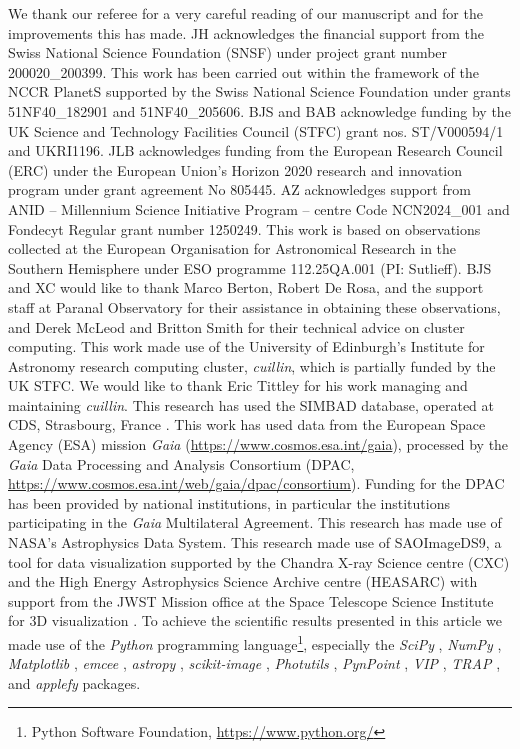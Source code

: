 \documentclass{aa}
\begin{document}
\begin{acknowledgements}

We thank our referee for a very careful reading of our manuscript and for the improvements this has made.
%
JH acknowledges the financial support from the Swiss National Science Foundation (SNSF) under project grant number 200020\_200399.
%
This work has been carried out within the framework of the NCCR PlanetS supported by the Swiss National Science Foundation under grants 51NF40\_182901 and 51NF40\_205606.
%
BJS and BAB acknowledge funding by the UK Science and Technology Facilities Council (STFC) grant nos. ST/V000594/1 and UKRI1196.
%
JLB acknowledges funding from the European Research Council (ERC) under the European Union's Horizon 2020 research and innovation program under grant agreement No 805445.
%
AZ acknowledges support from ANID -- Millennium Science Initiative Program -- centre Code NCN2024\_001 and Fondecyt Regular grant number 1250249.
%
This work is based on observations collected at the European Organisation for Astronomical Research in the Southern Hemisphere under ESO programme 112.25QA.001 (PI: Sutlieff).
%
BJS and XC would like to thank Marco Berton, Robert De Rosa, and the support staff at Paranal Observatory for their assistance in obtaining these observations, and Derek McLeod and Britton Smith for their technical advice on cluster computing.
%
This work made use of the University of Edinburgh's Institute for Astronomy research computing cluster, {\sl cuillin}, which is partially funded by the UK STFC. We would like to thank Eric Tittley for his work managing and maintaining {\sl cuillin}.
%
This research has used the SIMBAD database, operated at CDS, Strasbourg, France \citep{wenger2000}.
%
This work has used data from the European Space Agency (ESA) mission {\it Gaia} (\url{https://www.cosmos.esa.int/gaia}), processed by the {\it Gaia} Data Processing and Analysis Consortium (DPAC, \url{https://www.cosmos.esa.int/web/gaia/dpac/consortium}).
%
Funding for the DPAC has been provided by national institutions, in particular the institutions participating in the {\it Gaia} Multilateral Agreement.
%
This research has made use of NASA's Astrophysics Data System.
%
This research made use of SAOImageDS9, a tool for data visualization supported by the Chandra X-ray Science centre (CXC) and the High Energy Astrophysics Science Archive centre (HEASARC) with support from the JWST Mission office at the Space Telescope Science Institute for 3D visualization \citep{2003ASPC..295..489J}.
%
To achieve the scientific results presented in this article we made use of the \emph{Python} programming language\footnote{Python Software Foundation, \url{https://www.python.org/}}, especially the \emph{SciPy} \citep{virtanen2020}, \emph{NumPy} \citep{numpy}, \emph{Matplotlib} \citep{Matplotlib}, \emph{emcee} \citep{foreman-mackey2013}, \emph{astropy} \citep{astropy_1,astropy_2,astropy_3}, \emph{scikit-image} \citep{scikit-image}, \emph{Photutils} \citep{larry_bradley_2022_6385735}, \emph{PynPoint} \citep{Amara2012PYNPOINTexoplanets,Stolker2019PynPointdata}, \emph{VIP} \citep{2017AJ....154....7G,2023JOSS....8.4774C}, \emph{TRAP} \citep{Samland2021TRAP:Separations}, and \emph{applefy} \citep{Bonse2023ComparingNoise} packages.

\end{acknowledgements}



\end{document}
